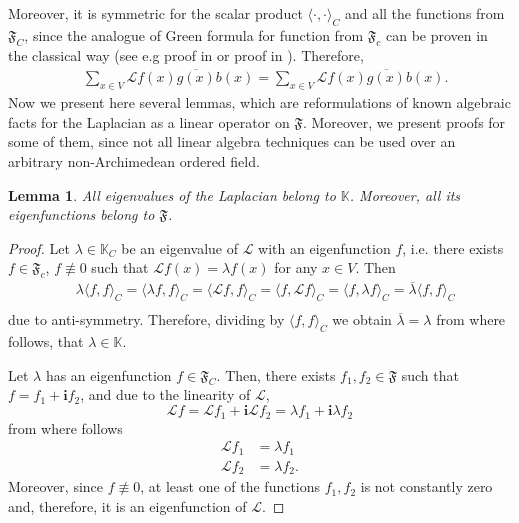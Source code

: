\documentclass[a4paper,12pt]{amsart}
\newtheorem{lemma}{Lemma}
\theoremstyle{definition}
\newcommand{\K}{\mathbb{K}}
\newcommand{\weight}{b}
\begin{document}
Moreover, it is symmetric for the scalar product $\langle \cdot , \cdot\rangle_C$ and  all the functions from $\mathfrak F_C$, since the analogue of Green formula for function from $\mathfrak F_c$ can be proven in the classical way (see e.g proof in \cite{Grigoryan} or proof in \cite[Thm. 22]{Muranova1}). Therefore,
\begin{align*}
&\sum_{x\in V}\mathcal L f(x)\overline{g(x)}\weight (x)=\sum_{x\in V}\mathcal L f(x)\overline{g(x)}\weight (x).
\end{align*}
Now we present here several lemmas, which are reformulations of known algebraic facts for the Laplacian as a linear operator on $\mathfrak F$. Moreover, we present proofs for some of them, since not all linear algebra techniques can be used over an arbitrary non-Archimedean ordered field.
\begin{lemma}
All eigenvalues of the Laplacian belong to $\K$. Moreover, all its eigenfunctions  belong to $ \mathfrak F$.
\end{lemma}
\begin{proof}
Let $\lambda\in \K_C$ be an eigenvalue of $\mathcal L$ with an eigenfunction $f$, i.e. there exists $f\in \mathfrak F_c$, $f\not\equiv 0$ such that $\mathcal L f(x)=\lambda f(x)$ for any $x\in V$. Then 
\begin{align*}
&\lambda\langle f,f\rangle_C=\langle \lambda f,f\rangle_C=\langle \mathcal L f,f\rangle_C=\langle  f,\mathcal L f\rangle_C=\langle f,\lambda  f\rangle_C=\overline{\lambda}\langle f,f\rangle_C\\
\end{align*}
due to anti-symmetry. Therefore, dividing by $\langle f,f\rangle_C$ we obtain $\overline{\lambda}=\lambda$ from where follows, that $\lambda \in \K$.

Let $\lambda$ has an eigenfunction  $f\in \mathfrak F_C$. Then, there exists $f_1, f_2\in \mathfrak F$ such that $f=f_1+\mathbf i f_2$, and due to the linearity of $\mathcal L$,
\begin{equation*}
\mathcal L f =\mathcal L f_1+\mathbf i\mathcal L f_2=\lambda f_1+\mathbf i\lambda f_2
\end{equation*}
from where follows
\begin{align*}
\mathcal L f_1&=\lambda f_1\\
\mathcal L f_2&=\lambda f_2.
\end{align*}
Moreover, since $f\not\equiv 0$, at least one of the functions $f_1, f_2$ is not constantly zero and, therefore, it is an eigenfunction of $\mathcal L$.

\end{proof}
\end{document}
